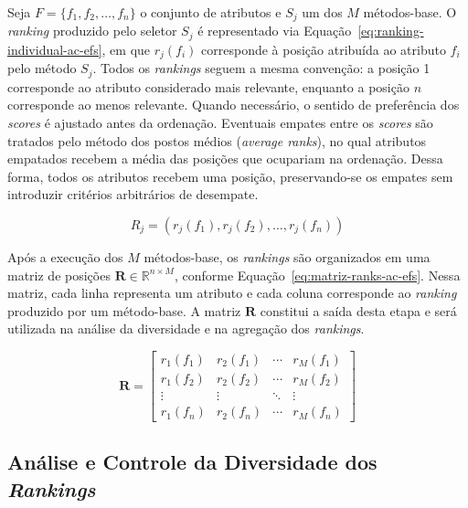 Seja $F=\{f_1,f_2,\ldots,f_n\}$ o conjunto de atributos e $S_j$ um dos $M$ métodos-base. O \textit{ranking} produzido pelo seletor $S_j$ é representado via Equação~\ref{eq:ranking-individual-ac-efs}, em que $r_j(f_i)$ corresponde à posição atribuída ao atributo $f_i$ pelo método $S_j$. Todos os \textit{rankings} seguem a mesma convenção: a posição 1 corresponde ao atributo considerado mais relevante, enquanto a posição $n$ corresponde ao menos relevante. Quando necessário, o sentido de preferência dos \textit{scores} é ajustado antes da ordenação. Eventuais empates entre os \textit{scores} são tratados pelo método dos postos médios (\textit{average ranks}), no qual atributos empatados recebem a média das posições que ocupariam na ordenação. Dessa forma, todos os atributos recebem uma posição, preservando-se os empates sem introduzir critérios arbitrários de desempate.

\begin{equation}\label{eq:ranking-individual-ac-efs}
    R_j =
    \left(
        r_j(f_1),
        r_j(f_2),
        \ldots,
        r_j(f_n)
    \right)
\end{equation}

Após a execução dos $M$ métodos-base, os \textit{rankings} são organizados em uma matriz de posições $\mathbf{R}\in\mathbb{R}^{n\times M}$, conforme Equação~\ref{eq:matriz-ranks-ac-efs}. Nessa matriz, cada linha representa um atributo e cada coluna corresponde ao \textit{ranking} produzido por um método-base. A matriz $\mathbf{R}$ constitui a saída desta etapa e será utilizada na análise da diversidade e na agregação dos \textit{rankings}.

\begin{equation}\label{eq:matriz-ranks-ac-efs}
    \mathbf{R}=
    \begin{bmatrix}
        r_1(f_1) & r_2(f_1) & \cdots & r_M(f_1) \\
        r_1(f_2) & r_2(f_2) & \cdots & r_M(f_2) \\
        \vdots   & \vdots   & \ddots & \vdots   \\
        r_1(f_n) & r_2(f_n) & \cdots & r_M(f_n)
    \end{bmatrix}
\end{equation}

\subsection{Análise e Controle da Diversidade dos \textit{Rankings}}\label{sec:ac-efs-etapa3}

